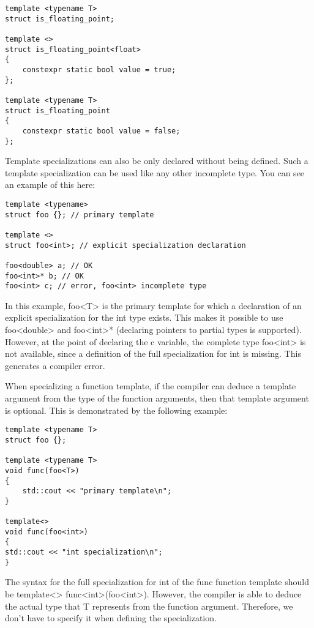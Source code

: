 \begin{lstlisting}[style=styleCXX]
template <typename T>
struct is_floating_point;

template <>
struct is_floating_point<float>
{
	constexpr static bool value = true;
};

template <typename T>
struct is_floating_point
{
	constexpr static bool value = false;
};
\end{lstlisting}

Template specializations can also be only declared without being defined. Such a template specialization can be used like any other incomplete type. You can see an example of this here:

\begin{lstlisting}[style=styleCXX]
template <typename>
struct foo {}; // primary template

template <>
struct foo<int>; // explicit specialization declaration

foo<double> a; // OK
foo<int>* b; // OK
foo<int> c; // error, foo<int> incomplete type
\end{lstlisting}

In this example, foo<T> is the primary template for which a declaration of an explicit specialization for the int type exists. This makes it possible to use foo<double> and foo<int>* (declaring pointers to partial types is supported). However, at the point of declaring the c variable, the complete type foo<int> is not available, since a definition of the full specialization for int is missing. This generates a compiler error.

When specializing a function template, if the compiler can deduce a template argument from the type of the function arguments, then that template argument is optional. This is demonstrated by the following example:

\begin{lstlisting}[style=styleCXX]
template <typename T>
struct foo {};

template <typename T>
void func(foo<T>)
{
	std::cout << "primary template\n";
}

template<>
void func(foo<int>)
{
std::cout << "int specialization\n";
}
\end{lstlisting}

The syntax for the full specialization for int of the func function template should be template<> func<int>(foo<int>). However, the compiler is able to deduce the actual type that T represents from the function argument. Therefore, we don't have to specify it when defining the specialization.

